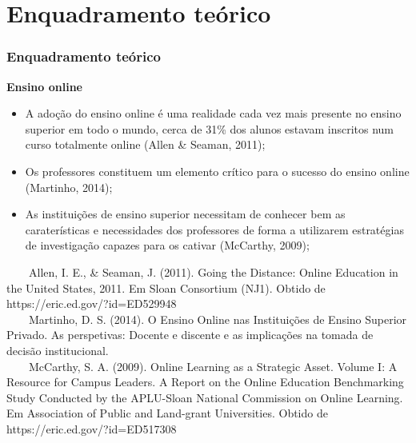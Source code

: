 \documentclass[10pt]{beamer}
\begin{document}
\section{Enquadramento teórico} %
\begin{comment}
Esta investigação, desenvolvida através da técnica de inquérito por questionário, pretende avaliar como é que esses docentes encararam essa realidade. O trabalho de campo foi realizado na primeira quinzena de abril de 2020 envolvendo docentes de uma instituição de ensino superior portuguesa tendo-se obtido 35 respostas válidas.

\end{comment}

\begin{frame}
	\frametitle{Enquadramento teórico}
	\Large
	\textbf{Ensino online}\\
		\begin{itemize} \normalsize
			\item A adoção do ensino online é uma realidade cada  vez  mais  presente  no ensino superior  em  todo  o  mundo, cerca de 31\% dos alunos estavam inscritos num curso totalmente online \footnotesize(Allen \& Seaman, 2011)\normalsize; 
			\item Os professores constituem um elemento crítico para o sucesso do ensino online \footnotesize(Martinho, 2014)\normalsize;
			\item As instituições de ensino superior necessitam de conhecer bem as caraterísticas e necessidades dos professores de forma a utilizarem estratégias de investigação capazes para os cativar \footnotesize(McCarthy, 2009)\normalsize;

		\end{itemize}	

	
	
	\tiny
	~~~~Allen, I. E., \& Seaman, J. (2011). Going the Distance: Online Education in the United States, 2011. Em Sloan Consortium (NJ1). Obtido de https://eric.ed.gov/?id=ED529948 \\
	~~~~Martinho, D. S. (2014). O Ensino Online nas Instituições de Ensino Superior Privado. As perspetivas: Docente e discente e as implicações na tomada de decisão institucional.\\
	~~~~McCarthy, S. A. (2009). Online Learning as a Strategic Asset. Volume I: A Resource for Campus Leaders. A Report on the Online Education Benchmarking Study Conducted by the APLU-Sloan National Commission on Online Learning. Em Association of Public and Land-grant Universities. Obtido de https://eric.ed.gov/?id=ED517308\\

\end{frame}
\end{document}
